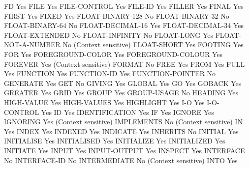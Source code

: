 FD                              Yes
FILE                            Yes
FILE-CONTROL                    Yes
FILE-ID                         Yes
FILLER                          Yes
FINAL                           Yes
FIRST                           Yes
FIXED                           Yes
FLOAT-BINARY-128                No
FLOAT-BINARY-32                 No
FLOAT-BINARY-64                 No
FLOAT-DECIMAL-16                Yes
FLOAT-DECIMAL-34                Yes
FLOAT-EXTENDED                  No
FLOAT-INFINITY                  No
FLOAT-LONG                      Yes
FLOAT-NOT-A-NUMBER              No (Context sensitive)
FLOAT-SHORT                     Yes
FOOTING                         Yes
FOR                             Yes
FOREGROUND-COLOR                Yes
FOREGROUND-COLOUR               Yes
FOREVER                         Yes (Context sensitive)
FORMAT                          No
FREE                            Yes
FROM                            Yes
FULL                            Yes
FUNCTION                        Yes
FUNCTION-ID                     Yes
FUNCTION-POINTER                No
GENERATE                        Yes
GET                             No
GIVING                          Yes
GLOBAL                          Yes
GO                              Yes
GOBACK                          Yes
GREATER                         Yes
GRID                            Yes
GROUP                           Yes
GROUP-USAGE                     No
HEADING                         Yes
HIGH-VALUE                      Yes
HIGH-VALUES                     Yes
HIGHLIGHT                       Yes
I-O                             Yes
I-O-CONTROL                     Yes
ID                              Yes
IDENTIFICATION                  Yes
IF                              Yes
IGNORE                          Yes
IGNORING                        Yes (Context sensitive)
IMPLEMENTS                      No (Context sensitive)
IN                              Yes
INDEX                           Yes
INDEXED                         Yes
INDICATE                        Yes
INHERITS                        No
INITIAL                         Yes
INITIALISE                      Yes
INITIALISED                     Yes
INITIALIZE                      Yes
INITIALIZED                     Yes
INITIATE                        Yes
INPUT                           Yes
INPUT-OUTPUT                    Yes
INSPECT                         Yes
INTERFACE                       No
INTERFACE-ID                    No
INTERMEDIATE                    No (Context sensitive)
INTO                            Yes
